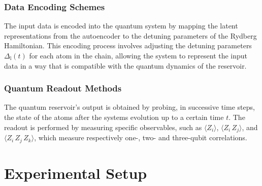 \documentclass[conference]{IEEEtran}
\begin{document}
\subsubsection{Data Encoding Schemes}
The input data is encoded into the quantum system by mapping
the latent representations from the autoencoder to the
detuning parameters of the Rydberg Hamiltonian.
This encoding process involves adjusting the detuning
parameters \( \Delta_{\mathrm{l}}(t) \) for each atom in the chain,
allowing the system to represent the input data in a way that
is compatible with the quantum dynamics of the reservoir.

\subsubsection{Quantum Readout Methods}
The quantum reservoir's output is obtained by probing, 
in successive time steps, the state of the atoms 
after the systems evolution up to a certain time \( t \).
The readout is performed by measuring specific observables,
such as $\langle Z_i \rangle$, $\langle Z_i \, Z_j\rangle$, and $\langle Z_i \, Z_j \, Z_k \rangle$, which measure respectively one-, two- and three-qubit correlations.


\section{Experimental Setup}
\end{document}
